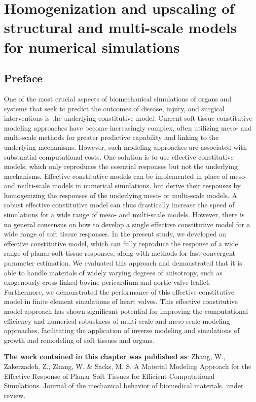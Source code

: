 \chapter{Homogenization and upscaling of structural and multi-scale models for numerical simulations}

\section*{Preface}
%

One of the most crucial aspects of biomechanical simulations of organs and systems that seek to predict the outcomes of disease, injury, and surgical interventions is the underlying constitutive model. Current soft tissue constitutive modeling approaches have become increasingly complex, often utilizing meso- and multi-scale methods for greater predictive capability and linking to the underlying mechanisms. However, such modeling approaches are associated with substantial computational costs. One solution is to use effective constitutive models, which only reproduces the essential responses but not the underlying mechanisms. Effective constitutive models can be implemented in place of meso- and multi-scale models in numerical simulations, but derive their responses by homogenizing the responses of the underlying meso- or multi-scale models. A robust effective constitutive model can thus drastically increase the speed of simulations for a wide range of meso- and multi-scale models. However, there is no general consensus on how to develop a single effective constitutive model for a wide range of soft tissue responses. In the present study, we developed an effective constitutive model, which can fully reproduce the response of a wide range of planar soft tissue responses, along with methods for fast-convergent parameter estimation. We evaluated this approach and demonstrated that it is able to handle materials of widely varying degrees of anisotropy, such as exogenously cross-linked bovine pericardium and aortic valve leaflet. Furthermore, we demonstrated the performance of this effective constitutive model in finite element simulations of heart valves. This effective constitutive model approach has shown significant potential for improving the computational efficiency and numerical robustness of multi-scale and meso-scale modeling approaches, facilitating the application of inverse modeling and simulations of growth and remodeling of soft tissues and organs.

\textbf{The work contained in this chapter was published as}: Zhang, W., Zakerzadeh, Z., Zhang, W. \& Sacks, M. S.
A Material Modeling Approach for the Effective Response of Planar Soft Tissues for Efficient Computational Simulations. 
Journal of the mechanical behavior of biomedical materials. under review.



